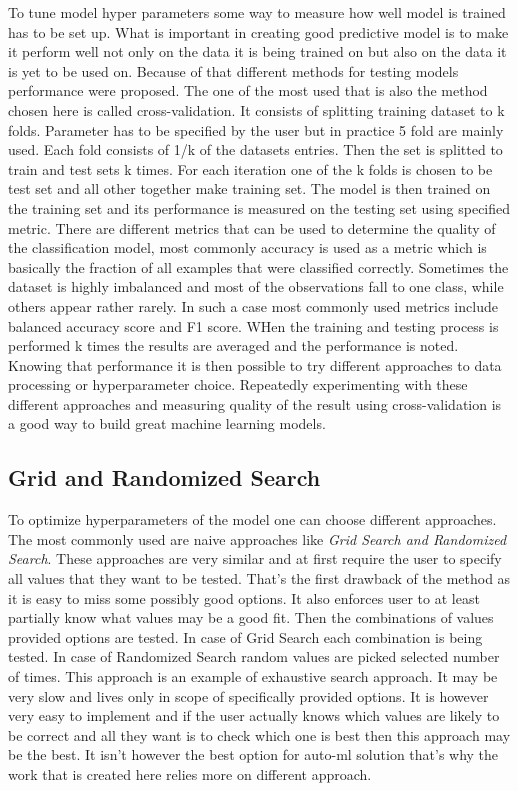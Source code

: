 \documentclass[a4paper,twoside,12pt]{book}
\begin{document}
To tune model hyper parameters some way to measure how well model is trained has to be set up. What is important in creating good predictive model is to make it perform well not only on the data it is being trained on but also on the data it is yet to be used on.
Because of that different methods for testing models performance were proposed. The one of the most used that is also the method chosen here is called cross-validation.
It consists of splitting training dataset to k folds. Parameter has to be specified by the user but in practice 5 fold are mainly used. Each fold consists of 1/k of the datasets entries. Then the set is splitted to train and test sets k times. For each iteration one of the k folds is chosen to be test set and all other together make training set. 
The model is then trained on the training set and its performance is measured on the testing set using specified metric.
There are different metrics that can be used to determine the quality of the classification model, most commonly accuracy is used as a metric which is basically the fraction of all examples that were classified correctly.
Sometimes the dataset is highly imbalanced and most of the observations fall to one class, while others appear rather rarely. In such a case most commonly used metrics include balanced accuracy score and F1 score.
WHen the training and testing process is performed k times the results are averaged and the performance is noted.
Knowing that performance it is then possible to try different approaches to data processing or hyperparameter choice. Repeatedly experimenting with these different approaches and measuring quality of the result using cross-validation is a good way to build great machine learning models.

\subsection{Grid and Randomized Search}

To optimize hyperparameters of the model one can choose different approaches. The most commonly used are naive approaches like \emph{Grid Search and Randomized Search}\cite{bergstra2012random}.
These approaches are very similar and at first require the user to specify all values that they want to be tested. That's the first drawback of the method as it is easy to miss some possibly good options. It also enforces user to at least partially know what values may be a good fit.
Then the combinations of values provided options are tested. In case of Grid Search each combination is being tested. In case of Randomized Search random values are picked selected number of times.
This approach is an example of exhaustive search approach. It may be very slow and lives only in scope of specifically provided options. 
It is however very easy to implement and if the user actually knows which values are likely to be correct and all they want is to check which one is best then this approach may be the best.
It isn't however the best option for auto-ml solution that's why the work that is created here relies more on different approach.
\end{document}

